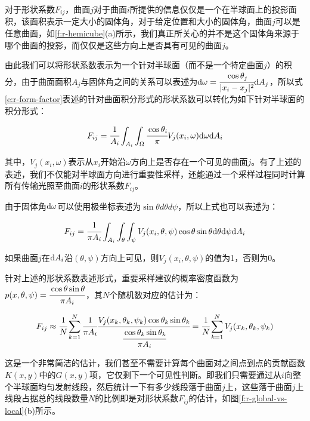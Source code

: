 对于形状系数$F_{ij}$，曲面$j$对于曲面$i$所提供的信息仅仅是一个在半球面上的投影面积，该面积表示一定大小的固体角，对于给定位置和大小的固体角，曲面$j$可以是任意曲面，如\ref{f:r-hemicube}(a)所示，我们真正所关心的并不是这个固体角来源于哪个曲面的投影，而仅仅是这些方向上是否具有可见的曲面$j$。

由此我们可以将形状系数表示为一个针对半球面（而不是一个特定曲面$j$）的积分，由于曲面面积$A_j$与固体角之间的关系可以表述为${\rm d}\omega= \cfrac{\cos\theta_j}{|x_i-x_j|^{2}}{\rm d}A_j$，所以式\ref{e:r-form-factor}表述的针对曲面积分形式的形状系数可以转化为如下针对半球面的积分形式：

\begin{equation}
	F_{ij}= \cfrac{1}{A_i}\int_{A_i}\int_{\Omega} \cfrac{\cos\theta_i}{\pi}V_j(x_i,\omega){\rm d}\omega {\rm d}A_i
\end{equation}

\noindent 其中，$V_j(x_i,\omega)$表示从$x_i$开始沿$\omega$方向上是否存在一个可见的曲面$j$。有了上述的表述，我们不仅能对半球面方向进行重要性采样，还能通过一个采样过程同时计算所有传输光照至曲面$i$的形状系数$F_{ij}$。

由于固体角${\rm d}\omega$可以使用极坐标表述为$\sin\theta d\theta d\psi$，所以上式也可以表述为：

\begin{equation}\label{e:r-form-factor-over-hemisphere}
	F_{ij}= \cfrac{1}{\pi A_i}\int_{A_i}\int_{\theta}\int_{\psi}V_j(x_i,\theta,\psi)\cos\theta\sin\theta {\rm d}\theta {\rm d}\psi {\rm d}A_i
\end{equation}

\noindent 如果曲面$j$在${\rm d}A_i$沿$(\theta,\psi)$方向上可见，则$V_j(x_i,\theta,\psi)$的值为1，否则为0。

针对上述的形状系数表述形式，重要采样建议的概率密度函数为$p(x,\theta,\psi)= \cfrac{\cos\theta\sin\theta}{\pi A_i}$，其$N$个随机数对应的估计为：

\begin{equation}
	F_{ij}\approx \cfrac{1}{N}\sum^{N}_{k=1} \cfrac{1}{\pi A_i} \cfrac{V_j(x_k,\theta_k,\psi_k)\cos\theta_k\sin\theta_k}{ \cfrac{\cos\theta_k\sin\theta_k}{\pi A_i}}= \cfrac{1}{N}\sum^{N}_{k=1}V_j(x_k,\theta_k,\psi_k)
\end{equation}

这是一个非常简洁的估计，我们甚至不需要计算每个曲面对之间点到点的贡献函数$K(x,y)$中的$G(x,y)$项，它仅剩下一个可见性判断。即我们只需要通过从$i$向整个半球面均匀发射线段，然后统计一下有多少线段落于曲面$j$上，这些落于曲面$j$上线段占据总的线段数量$N$的比例即是对形状系数$F_{ij}$的估计，如图\ref{f:r-global-vs-local}(b)所示。

